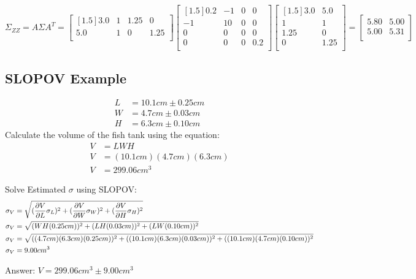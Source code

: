 \[
\Sigma_{ZZ} = A\Sigma A^T = 
\begin{bmatrix}[1.5]
3.0 & 1 & 1.25 & 0 \\
5.0 & 1 & 0 & 1.25 \\
\end{bmatrix}
\begin{bmatrix}[1.5]
0.2 & -1  & 0 & 0\\
-1 & 10  & 0 & 0\\
0 & 0  & 0 & 0 \\
0 & 0  & 0 & 0.2 \\
\end{bmatrix}
\begin{bmatrix}[1.5]
3.0   & 5.0  \\
1   & 1  \\
1.25 & 0 \\
0 & 1.25 \\
\end{bmatrix}
= 
\begin{bmatrix}
5.80&5.00\\
5.00&5.31\\
\end{bmatrix}
\]
\subsection{SLOPOV Example}
\begin{align*}
L &= 10.1 cm \pm 0.25cm \\
W &= 4.7 cm  \pm 0.03cm \\
H &= 6.3 cm  \pm 0.10cm
\end{align*}
Calculate the volume of the fish tank using the equation:
\begin{align*}
V &= LWH \\
V &= (10.1cm)(4.7cm)(6.3cm) \\
V &= 299.06 cm^3
\end{align*}

Solve Estimated $\sigma$ using SLOPOV:
\begin{align*}
\sigma_{V} &= \sqrt{(\frac{\partial V}{\partial L} \sigma_{L})^2+(\frac{\partial V}{\partial W} \sigma_{W})^2+(\frac{\partial V}{\partial H} \sigma_{H})^2} \\
\sigma_{V} &= \sqrt{(WH (0.25cm))^2+(LH (0.03cm))^2+(LW (0.10cm))^2} \\
\sigma_{V} &= \sqrt{((4.7cm)(6.3cm)(0.25cm))^2+((10.1cm)(6.3cm) (0.03cm))^2+((10.1cm)(4.7cm) (0.10cm))^2} \\
\sigma_V &= 9.00 cm^3
\end{align*}

Answer: $V = 299.06 cm^3 \pm 9.00 cm^3$